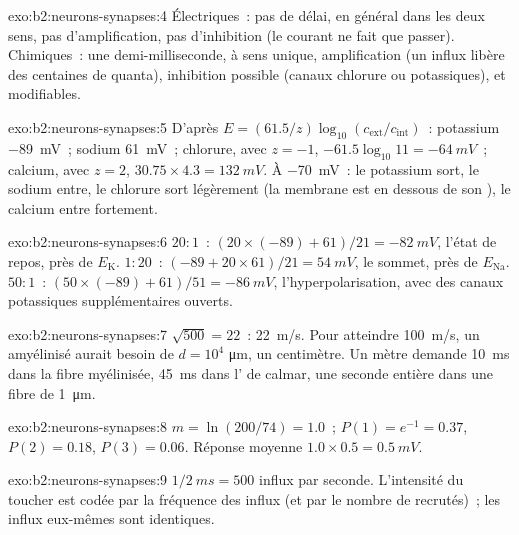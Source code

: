 \begin{solution}{exo:b2:neurons-synapses:4}
Électriques~: pas de délai, en général dans les deux sens, pas
d'amplification, pas d'inhibition (le courant ne fait que passer).
Chimiques~: une demi-milliseconde, à sens unique, amplification (un
influx libère des centaines de quanta), inhibition possible (canaux
chlorure ou potassiques), et modifiables.
\end{solution}

\begin{solution}{exo:b2:neurons-synapses:5}
D'après $E = (61.5/z)\log_{10}(c_{\text{ext}}/c_{\text{int}})$~:
potassium \qty{-89}{mV}~; sodium \qty{+61}{mV}~; chlorure, avec $z =
-1$, $-61.5\log_{10} 11 = \qty{-64}{mV}$~; calcium, avec $z = 2$,
$30.75\times 4.3 = \qty{+132}{mV}$. À \qty{-70}{mV}~: le potassium
sort, le sodium entre, le chlorure sort légèrement (la membrane est en
dessous de son ), le calcium entre fortement.
\end{solution}

\begin{solution}{exo:b2:neurons-synapses:6}
$20 : 1$~: $(20\times(-89) + 61)/21 = \qty{-82}{mV}$, l'état de repos,
près de $E_{\mathrm K}$. $1 : 20$~: $(-89 + 20\times 61)/21 =
\qty{+54}{mV}$, le sommet, près de $E_{\mathrm{Na}}$. $50 : 1$~: $(50\times
(-89) + 61)/51 = \qty{-86}{mV}$, l'hyperpolarisation, avec des canaux
potassiques supplémentaires ouverts.
\end{solution}

\begin{solution}{exo:b2:neurons-synapses:7}
$\sqrt{500} = 22$~: \qty{22}{m/s}. Pour atteindre \qty{100}{m/s}, un
 amyélinisé aurait besoin de $d = 10^{4}$ \unit{\micro m}, un
centimètre. Un mètre demande \qty{10}{ms} dans la fibre myélinisée,
\qty{45}{ms} dans l' de calmar, une seconde entière dans une fibre
de \qty{1}{\micro m}.
\end{solution}

\begin{solution}{exo:b2:neurons-synapses:8}
$m = \ln(200/74) = 1.0$~; $P(1) = e^{-1} = 0.37$, $P(2) = 0.18$, $P(3)
= 0.06$. Réponse moyenne $1.0\times 0.5 = \qty{0.5}{mV}$.
\end{solution}

\begin{solution}{exo:b2:neurons-synapses:9}
$1/\qty{2}{ms} = 500$ influx par seconde. L'intensité du toucher est
codée par la fréquence des influx (et par le nombre de 
recrutés)~; les influx eux-mêmes sont identiques.
\end{solution}

